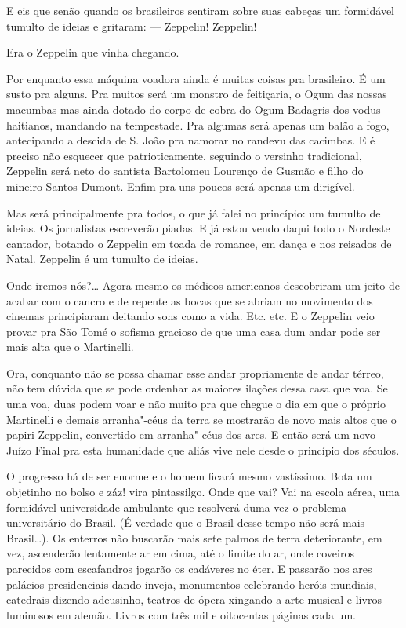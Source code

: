 E eis que senão quando os brasileiros sentiram sobre suas cabeças um
formidável tumulto de ideias e gritaram: --- Zeppelin! Zeppelin!

Era o Zeppelin que vinha chegando.

Por enquanto essa máquina voadora ainda é muitas coisas pra brasileiro.
É um susto pra alguns. Pra muitos será um monstro de feitiçaria, o Ogum
das nossas macumbas mas ainda dotado do corpo de cobra do Ogum Badagris
dos vodus haitianos, mandando na tempestade. Pra algumas será apenas um
balão a fogo, antecipando a descida de S. João pra namorar no randevu
das cacimbas. E é preciso não esquecer que patrioticamente, seguindo o
versinho tradicional, Zeppelin será neto do santista Bartolomeu Lourenço
de Gusmão e filho do mineiro Santos Dumont. Enfim pra uns poucos será
apenas um dirigível.

Mas será principalmente pra todos, o que já falei no princípio: um
tumulto de ideias. Os jornalistas escreverão piadas. E já estou vendo
daqui todo o Nordeste cantador, botando o Zeppelin em toada de romance,
em dança e nos reisados de Natal. Zeppelin é um tumulto de ideias.

Onde iremos nós?\ldots{} Agora mesmo os médicos americanos descobriram um
jeito de acabar com o cancro e de repente as bocas que se abriam no
movimento dos cinemas principiaram deitando sons como a vida. Etc. etc.
E o Zeppelin veio provar pra São Tomé o sofisma gracioso de que uma casa
dum andar pode ser mais alta que o Martinelli.

Ora, conquanto não se possa chamar esse andar propriamente de andar
térreo, não tem dúvida que se pode ordenhar as maiores ilações dessa
casa que voa. Se uma voa, duas podem voar e não muito pra que chegue o
dia em que o próprio Martinelli e demais arranha"-céus da terra se
mostrarão de novo mais altos que o papiri Zeppelin, convertido em
arranha"-céus dos ares. E então será um novo Juízo Final pra esta
humanidade que aliás vive nele desde o princípio dos séculos.

O progresso há de ser enorme e o homem ficará mesmo vastíssimo. Bota um
objetinho no bolso e záz! vira pintassilgo. Onde que vai? Vai na escola
aérea, uma formidável universidade ambulante que resolverá duma vez o
problema universitário do Brasil. (É verdade que o Brasil desse tempo
não será mais Brasil\ldots{}). Os enterros não buscarão mais sete palmos de
terra deteriorante, em vez, ascenderão lentamente ar em cima, até o
limite do ar, onde coveiros parecidos com escafandros jogarão os
cadáveres no éter. E passarão nos ares palácios presidenciais dando
inveja, monumentos celebrando heróis mundiais, catedrais dizendo
adeusinho, teatros de ópera xingando a arte musical e livros luminosos
em alemão. Livros com três mil e oitocentas páginas cada um.

